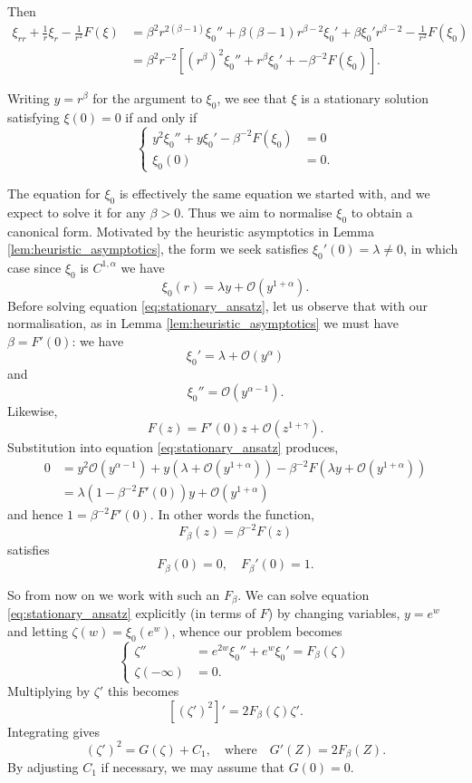 \documentclass{amsart}
\begin{document}
Then
\[
\begin{split}
\xi_{rr} + \frac{1}{r} \xi_r - \frac{1}{r^2} F(\xi) &= \beta^2 r^{2(\beta-1)} \xi_0'' + \beta (\beta - 1) r^{\beta-2} \xi_0' + \beta \xi_0' r^{\beta-2} - \frac{1}{r^2} F(\xi_0) \\
&= \beta^2 r^{-2} \left[(r^{\beta})^2 \xi_0'' + r^{\beta} \xi_0' + - \beta^{-2}F(\xi_0)\right].
\end{split}
\]

Writing \(y = r^{\beta}\) for the argument to \(\xi_0\), we see that \(\xi\) is a stationary solution satisfying \(\xi(0) = 0\) if and only if
\begin{equation}
\label{eq:stationary_ansatz}
\begin{cases}
y^2 \xi_0'' + y \xi_0' - \beta^{-2} F(\xi_0) &= 0 \\
\xi_0(0) &= 0.
\end{cases}
\end{equation}

The equation for \(\xi_0\) is effectively the same equation we started with, and we expect to solve it for any \(\beta > 0\). Thus we aim to normalise \(\xi_0\) to obtain a canonical form. Motivated by the heuristic asymptotics in Lemma \ref{lem:heuristic_asymptotics}, the form we seek satisfies \(\xi_0'(0) = \lambda \ne 0\), in which case since \(\xi_0\) is \(C^{1,\alpha}\) we have
\[
\xi_0(r) = \lambda y + \mathcal{O}(y^{1+\alpha}).
\]
Before solving equation \eqref{eq:stationary_ansatz}, let us observe that with our normalisation, as in Lemma \ref{lem:heuristic_asymptotics} we must have \(\beta = F'(0)\): we have
\[
\xi_0' = \lambda + \mathcal{O} (y^{\alpha})
\]
and
\[
\xi_0'' = \mathcal{O} (y^{\alpha-1}).
\]
Likewise,
\[
F(z) = F'(0) z + \mathcal{O}(z^{1+\gamma}).
\]
Substitution into equation \eqref{eq:stationary_ansatz} produces,
\[
\begin{split}
0 &= y^2 \mathcal{O}(y^{\alpha-1}) + y \left(\lambda + \mathcal{O}(y^{1+\alpha})\right) - \beta^{-2} F(\lambda y + \mathcal{O} (y^{1 + \alpha})) \\
&= \lambda(1 - \beta^{-2} F'(0)) y + \mathcal{O}(y^{1+\alpha})
\end{split}
\]
and hence \(1 = \beta^{-2} F'(0)\). In other words the function,
\[
F_{\beta}(z) = \beta^{-2} F(z)
\]
satisfies
\[
F_{\beta} (0) = 0, \quad F_{\beta}'(0) = 1.
\]

So from now on we work with such an \(F_{\beta}\). We can solve equation \eqref{eq:stationary_ansatz} explicitly (in terms of \(F\)) by changing variables, \(y = e^w\) and letting \(\zeta(w) = \xi_0(e^w)\), whence our problem becomes
\[
\begin{cases}
\zeta'' &= e^{2w} \xi_0'' + e^w \xi_0' = F_{\beta} (\zeta) \\
\zeta(-\infty) &= 0.
\end{cases}
\]
Multiplying by \(\zeta'\) this becomes
\[
[(\zeta')^2]' = 2 F_{\beta} (\zeta) \zeta'.
\]
Integrating gives
\[
(\zeta')^2 = G(\zeta) + C_1, \quad \text{where} \quad G'(Z) = 2 F_{\beta}(Z).
\]
By adjusting \(C_1\) if necessary, we may assume that \(G(0) = 0\).
\end{document}
